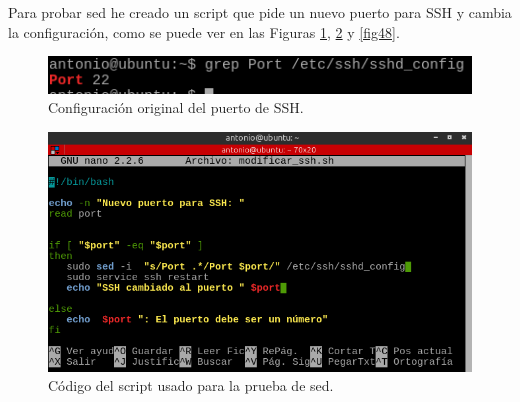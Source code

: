 Para probar sed he creado un script que pide un nuevo puerto para SSH y cambia la configuración, como se puede ver en las Figuras \ref{fig46}, \ref{fig47} y \ref{fig48}.\cite{sed}


\begin{figure}[H]
    \begin{center}
        \includegraphics[scale=0.8]{imagenes/img49}
        \caption{Configuración original del puerto de SSH.}
        \label{fig46}
    \end{center}
\end{figure}

\begin{figure}[H]
    \begin{center}
        \includegraphics[scale=0.65]{imagenes/img50}
        \caption{Código del script usado para la prueba de sed.}
        \label{fig47}
    \end{center}
\end{figure}



